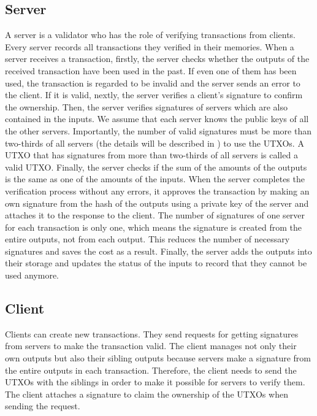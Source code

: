 \documentclass[a4paper, oneside]{discothesis}
\begin{document}
\subsection{Server}
A server is a validator who has the role of verifying transactions from clients.
Every server records all transactions they verified in their memories.
When a server receives a transaction, firstly, the server checks
whether the outputs of the received transaction have been used in the past.
If even one of them has been used, the transaction is regarded to be invalid
and the server sends an error to the client.
If it is valid, nextly, the server verifies a client's signature to confirm the ownership.
Then, the server verifies signatures of servers which are also contained in the inputs.
We assume that each server knows the public keys of all the other servers.
Importantly, the number of valid signatures must be more than two-thirds of all servers
(the details will be described in ) to use the UTXOs. %
A UTXO that has signatures from more than two-thirds of all servers is called a valid UTXO.
Finally, the server checks if the sum of the amounts of the outputs is the same
as one of the amounts of the inputs.
When the server completes the verification process without any errors,
it approves the transaction by making an own signature from the hash of the outputs
using a private key of the server and attaches it to the response to the client.
The number of signatures of one server for each transaction is only one,
which means the signature is created from the entire outputs, not from each output.
This reduces the number of necessary signatures and saves the cost as a result.
Finally, the server adds the outputs into their storage
and updates the status of the inputs to record that they cannot be used anymore.



\subsection{Client}
Clients can create new transactions.
They send requests for getting signatures from servers to make the transaction valid.
The client manages not only their own outputs but also their sibling outputs
because servers make a signature from the entire outputs in each transaction.
Therefore, the client needs to send the UTXOs with the siblings
in order to make it possible for servers to verify them.
The client attaches a signature to claim the ownership of the UTXOs when sending the request.
\end{document}

